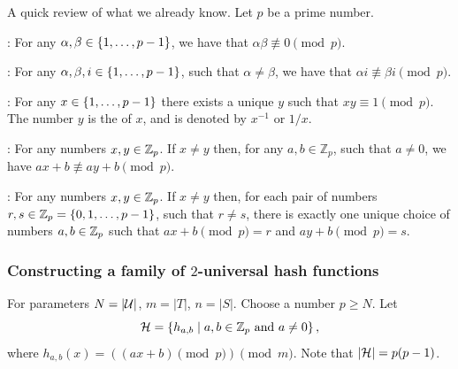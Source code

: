\begin{remark}
    A quick review of what we already know. 
    Let $p$ be a prime number.

    \begin{compactenumA}
        \item {}: For any
        $\alpha, \beta \in \left\{ { 1, \ldots, p-1} \right\}$, we have that
        $\alpha \beta \not \equiv 0 \pmod{p}$.

        \item {}: For any
        $\alpha, \beta, i \in \left\{ { 1,\ldots, p-1} \right\}$, such that
        $\alpha \ne \beta$, we have that
        $\alpha i \nequiv \beta i \pmod{p}$.

        
        \item {}: For any
        $x \in \left\{ {1,\ldots, p-1} \right\}$ there exists a unique $y$ such
        that $xy \equiv 1 \pmod{p}$. The number $y$ is the
         of $x$, and is denoted by $x^{-1}$ or $1/x$. %

        \item {}: For any numbers
        $x, y \in \mathbb{Z}_p$.  If $x \neq y$ then, for any
        $a, b \in \mathbb{Z}_p$, such that $a \neq 0$, we have
        $a x + b \nequiv a y + b \pmod p$.

        \item {}: For any numbers
        $x, y \in \mathbb{Z}_p$.  If $x \neq y$ then, for each pair of
        numbers $r,s \in \mathbb{Z}_{p} = \{0,1, \ldots, p-1\}$, such that
        $r \neq s$, there is exactly one unique choice of numbers
        $a,b \in \mathbb{Z}_p$ such that $ax + b \pmod p = r$ and
        $ay + b \pmod p = s$.

    \end{compactenumA}
\end{remark}




\subsubsection{Constructing a family of $2$-universal hash functions}

For parameters $N = |\mathcal{U}|$, $m = |T|$, $n = |S|$. Choose a
 number $p \ge N$. Let
\begin{equation*}
    \mathcal{H} = \left\{ h_{a,b}  \;\middle\vert\; a,b \in \mathbb{Z}_p \text{ and } a \neq 0 \right\},
\end{equation*}
where $h_{a,b}(x) = ((ax + b) \pmod p) \pmod m$. Note that
$|\mathcal{H}| = p(p-1)$. %

